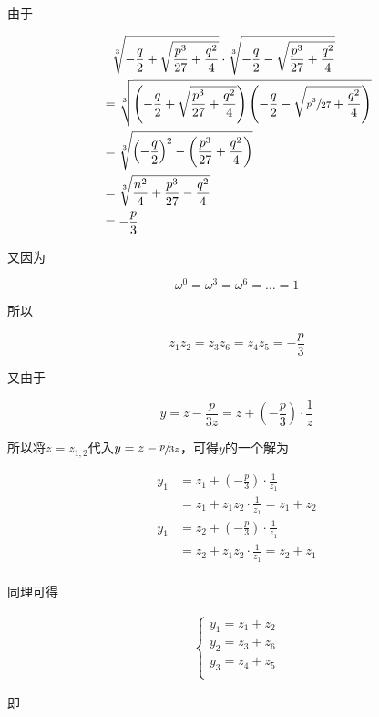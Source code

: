 由于

\begin{align*}
  &\phantom{=} \sqrt[3]{-\frac q2 + \sqrt{\frac{p^3}{27} + \frac{q^2}4}}\cdot\sqrt[3]{-\frac q2 - \sqrt{\frac{p^3}{27} + \frac{q^2}4}} \\
  &= \sqrt[3]{\left(-\frac q2 + \sqrt{\frac{p^3}{27} + \frac{q^2}4}\right)\left(-\frac q2 - \sqrt{\sfrac{p^3}{27} + \frac{q^2}4}\right)} \\
  &= \sqrt[3]{\left(-\frac q2\right)^2 - \left(\frac{p^3}{27} + \frac{q^2}4\right)} \\
  &= \sqrt[3]{\frac{n^2}4 + \frac{p^3}{27} - \frac{q^2}4} \\
  &= -\frac p3 \\
\end{align*}

又因为

\[ \omega^0 = \omega^3 = \omega^6 = \dots = 1 \]

所以

\[ z_1z_2 = z_3z_6 = z_4z_5 = -\frac p3 \]

又由于

\[ y = z - \frac p{3z} = z + \left(-\frac p3\right)\cdot\frac 1z \]

所以将$z = z_{1,2}$代入$y = z - \sfrac p{3z}$，可得$y$的一个解为

\begin{align*}
  y_1 &= z_1 + \left(-\frac p3\right)\cdot\frac 1{z_1} \\
  &= z_1 + z_1z_2\cdot\frac 1{z_1} = z_1 + z_2 \\
  y_1 &= z_2 + \left(-\frac p3\right)\cdot\frac 1{z_1} \\
  &= z_2 + z_1z_2\cdot\frac 1{z_1} = z_2 + z_1 \\
\end{align*}

同理可得

\begin{align*}
  \begin{cases}
    y_1 = z_1 + z_2 \\
    y_2 = z_3 + z_6 \\
    y_3 = z_4 + z_5 \\
  \end{cases}
\end{align*}

即

